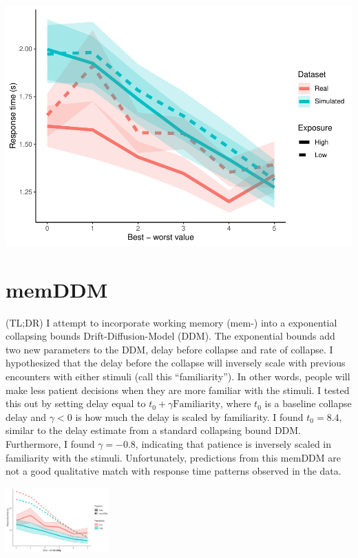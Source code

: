 \documentclass[
]{book}
\begin{document}
\includegraphics{LateNightBayes_files/figure-latex/unnamed-chunk-54-1.pdf}

\hypertarget{memDDM}{%
\chapter{memDDM}\label{memDDM}}

(TL;DR) I attempt to incorporate working memory (mem-) into a exponential collapsing bounds Drift-Diffusion-Model (DDM). The exponential bounds add two new parameters to the DDM, delay before collapse and rate of collapse. I hypothesized that the delay before the collapse will inversely scale with previous encounters with either stimuli (call this ``familiarity''). In other words, people will make less patient decisions when they are more familiar with the stimuli. I tested this out by setting delay equal to \(t_0 + \gamma \text{Familiarity}\), where \(t_0\) is a baseline collapse delay and \(\gamma<0\) is how much the delay is scaled by familiarity. I found \(t_0=8.4\), similar to the delay estimate from a standard collapsing bound DDM. Furthermore, I found \(\gamma=-0.8\), indicating that patience is inversely scaled in familiarity with the stimuli. Unfortunately, predictions from this memDDM are not a good qualitative match with response time patterns observed in the data.

\includegraphics[width=0.3\textwidth,height=\textheight]{images/memDDM-featured.PNG}
\end{document}
